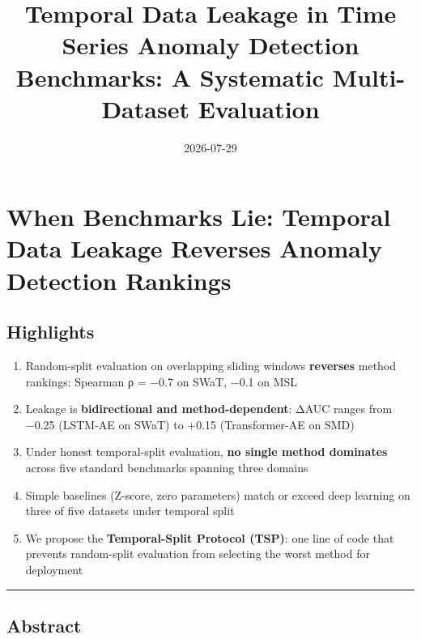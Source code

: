 \documentclass[
]{article}
\title{Temporal Data Leakage in Time Series Anomaly Detection
Benchmarks: A Systematic Multi-Dataset Evaluation}
\author{}
\date{2026-07-29}
\providecommand{\tightlist}{%
  \setlength{\itemsep}{0pt}\setlength{\parskip}{0pt}}
\begin{document}
\maketitle

\section{When Benchmarks Lie: Temporal Data Leakage Reverses Anomaly
Detection
Rankings}\label{when-benchmarks-lie-temporal-data-leakage-reverses-anomaly-detection-rankings}

\subsection{Highlights}\label{highlights}

\begin{enumerate}
\def\labelenumi{\arabic{enumi}.}
\tightlist
\item
  Random-split evaluation on overlapping sliding windows
  \textbf{reverses} method rankings: Spearman ρ = −0.7 on SWaT, −0.1 on
  MSL
\item
  Leakage is \textbf{bidirectional and method-dependent}: ΔAUC ranges
  from −0.25 (LSTM-AE on SWaT) to +0.15 (Transformer-AE on SMD)
\item
  Under honest temporal-split evaluation, \textbf{no single method
  dominates} across five standard benchmarks spanning three domains
\item
  Simple baselines (Z-score, zero parameters) match or exceed deep
  learning on three of five datasets under temporal split
\item
  We propose the \textbf{Temporal-Split Protocol (TSP)}: one line of
  code that prevents random-split evaluation from selecting the worst
  method for deployment
\end{enumerate}

\begin{center}\rule{0.5\linewidth}{0.5pt}\end{center}

\subsection{Abstract}\label{abstract}
\end{document}

